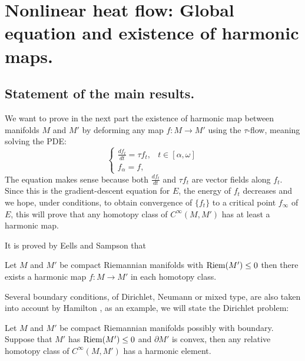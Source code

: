 \section{Nonlinear heat flow: Global equation and existence of harmonic maps.}
\label{sec:org6190a72}
\subsection{Statement of the main results.}
\label{sec:org69a04d2}

We want to prove in the next part the existence of harmonic map between manifolds \(M\)
and \(M'\) by deforming any map \(f: M
\longrightarrow M'\) using the \(\tau\)-flow, meaning solving the PDE:
\begin{equation}
\label{eq:loc-heat-flow}
\begin{cases}
\frac{d f_t}{d t} = \tau f_t,  & t\in [\alpha,\omega] \\
f_\alpha = f, & 
\end{cases}
\end{equation}
The equation makes sense because both \(\frac{d f_t}{d t}\) and \(\tau f_t\) are
vector fields along \(f_t\). Since this is the gradient-descent equation for \(E\),
the energy of \(f_t\) decreases and we hope, under conditions, to obtain
convergence of \(\{f_t\}\) to a critical point \(f_\infty\) of \(E\), this will prove
that any homotopy class of \(C^\infty(M,M')\) has at least a harmonic map.

It is proved by Eells and Sampson \cite{eells_harmonic_1964} that
\begin{theorem}
\label{thm:eells-sampson}
Let \(M\) and \(M'\) be compact Riemannian manifolds with \({\rm Riem } (M') \leq 0\) then there exists a harmonic map \(f: M \longrightarrow M'\) in each homotopy class.
\end{theorem}

Several boundary conditions, of Dirichlet, Neumann or mixed type, are also taken into account by Hamilton
\cite{hamilton_harmonic_1975}, as an example, we will state the Dirichlet problem:

\begin{theorem}[Hamilton]
\label{thm:hamilton-bndry-Dirichlet}
Let \(M\) and \(M'\) be compact Riemannian manifolds possibly with boundary. Suppose
that \(M'\) has \({\rm Riem } (M')\leq 0\) and \(\partial M'\) is convex, then any
relative homotopy class of \(C^\infty(M,M')\) has a harmonic element. 
\end{theorem}

